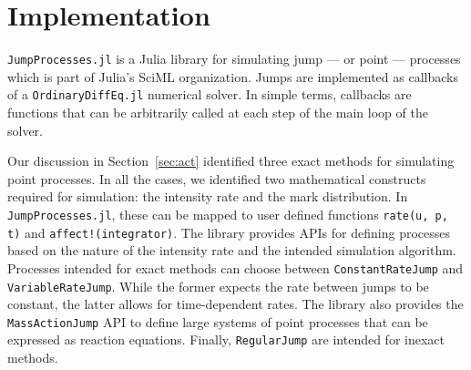 \documentclass{juliacon}
\numberwithin{equation}{section}
\begin{document}


\section{Implementation} \label{sec:implementation}

\texttt{JumpProcesses.jl} is a Julia library for simulating jump --- or point --- processes which is part of Julia's SciML organization. Jumps are implemented as callbacks of a \texttt{OrdinaryDiffEq.jl} numerical solver. In simple terms, callbacks are functions that can be arbitrarily called at each step of the main loop of the solver.

Our discussion in Section~\ref{sec:act} identified three exact methods for simulating point processes. In all the cases, we identified two mathematical constructs required for simulation: the intensity rate and the mark distribution. In \texttt{JumpProcesses.jl}, these can be mapped to user defined functions \texttt{rate(u, p, t)} and \texttt{affect!(integrator)}. The library provides APIs for defining processes based on the nature of the intensity rate and the intended simulation algorithm. Processes intended for exact methods can choose between \texttt{ConstantRateJump} and \texttt{VariableRateJump}. While the former expects the rate between jumps to be constant, the latter allows for time-dependent rates. The library also provides the \texttt{MassActionJump} API to define large systems of point processes that can be expressed as reaction equations. Finally, \texttt{RegularJump} are intended for inexact methods.
\end{document}
